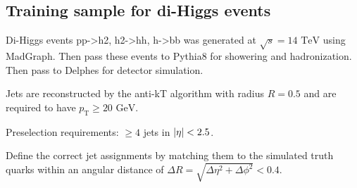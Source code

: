 \documentclass[12pt]{article}
\begin{document}
	\subsection{Training sample for di-Higgs events}%
	\label{sub:training_sample_for_dihiggs_events}
		Di-Higgs events pp->h2, h2->hh, h->bb was generated at $\sqrt{s}= \text{14 TeV}$ using MadGraph. Then pass these events to Pythia8 for showering and hadronization. Then pass to Delphes for detector simulation.
	
		Jets are reconstructed by the anti-kT algorithm with radius $R=0.5$ and are required to have $p_\text{T}\ge \text{20 GeV}$.

		Preselection requirements: $\ge 4$ jets in  $\abs{\eta}<2.5$.

		Define the correct jet assignments by matching them to the simulated truth quarks within an angular distance of $\Delta R = \sqrt{\Delta\eta^2 + \Delta\phi^2}<0.4$.
\end{document}
